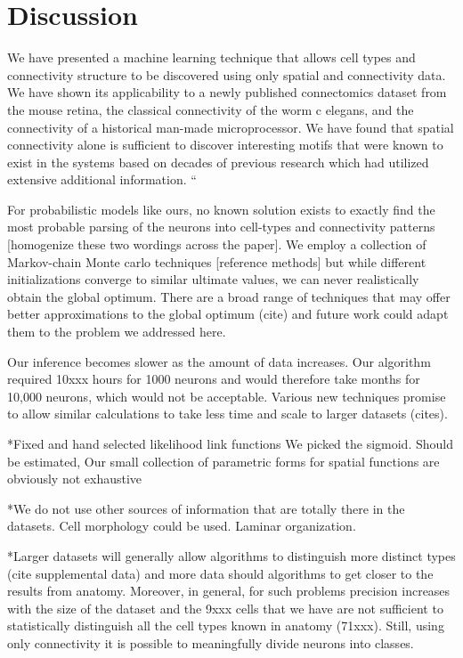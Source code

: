 \documentclass{article}
\begin{document}
\section{Discussion}
We have presented a machine learning technique that allows cell types and connectivity structure to be discovered using only spatial and connectivity data. We have shown its applicability to a newly published connectomics dataset from the mouse retina, the classical connectivity of the worm c elegans, and the connectivity of a historical man-made microprocessor. We have found that spatial connectivity alone is sufficient to discover interesting motifs that were known to exist in the systems based on decades of previous research which had utilized extensive additional information. “

For probabilistic models like ours, no known solution exists to exactly find the most probable parsing of the neurons into cell-types and connectivity patterns [homogenize these two wordings across the paper]. We employ a collection of Markov-chain Monte carlo techniques [reference methods] but while different initializations converge to similar ultimate values, we can never realistically obtain the global optimum. There are a broad range of techniques that may offer better approximations to the global optimum (cite) and future work could adapt them to the problem we addressed here. 

Our inference becomes slower as the amount of data increases. Our algorithm required 10xxx hours for 1000 neurons and would therefore take months for 10,000 neurons, which would not be acceptable. Various new techniques promise to allow similar calculations to take less time and scale to larger datasets (cites). 


*Fixed and hand selected likelihood link functions We picked the sigmoid. Should be estimated, Our small collection of parametric forms for spatial functions are obviously not exhaustive

*We do not use other sources of information that are totally there in the datasets. Cell morphology could be used. Laminar organization.

*Larger datasets will generally allow algorithms to distinguish more distinct types (cite supplemental data) and more data should algorithms to get closer to the results from anatomy. Moreover, in general, for such problems precision increases with the size of the dataset and the 9xxx cells that we have are not sufficient to statistically distinguish all the cell types known in anatomy (71xxx). Still, using only connectivity it is possible to meaningfully divide neurons into classes. 
\end{document}
